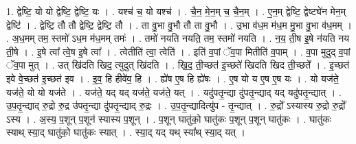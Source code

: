 \documentclass[17pt]{extarticle}
\begin{document}
1. द्वेष्टि॒ यो यो द्वेष्टि॒ द्वेष्टि॒ यः । . यश्च॑ च॒ यो यश्च॑ । . चै॒न॒ मे॒न॒म् च॒ चै॒न॒म् । . ए॒न॒म् द्वेष्टि॒ द्वेष्ट्ये॑न मेन॒म् द्वेष्टि॑ । . द्वेष्टि॒ तौ तौ द्वेष्टि॒ द्वेष्टि॒ तौ । . ता वु॒भा वु॒भौ तौ ता वु॒भौ । . उ॒भा व॑ध॒म म॑ध॒म मु॒भा वु॒भा व॑ध॒मम् । . अ॒ध॒मम् तम॒ स्तमो॑ ऽध॒म म॑ध॒मम् तमः॑ । . तमो॑ नयति नयति॒ तम॒ स्तमो॑ नयति । . न॒य॒ ती॒ष इ॒षे न॑यति नय ती॒षे । . इ॒षे त्वा᳚ त्वे॒ष इ॒षे त्वा᳚ । . त्वेतीति॑ त्वा॒ त्वेति॑ । . इति॑ व॒पां ॅव॒पा मितीति॑ व॒पाम् । . व॒पा मुदुद् व॒पां ॅव॒पा मुत् । . उत् खि॑दति खिद॒ त्युदुत् खि॑दति । . खि॒द॒ ती॒च्छत॑ इ॒च्छते॑ खिदति खिद ती॒च्छते᳚ । . इ॒च्छत॑ इवे वे॒च्छत॑ इ॒च्छत॑ इव । . इ॒व॒ हि हीवे॑व॒ हि । . ह्ये॑ष ए॒ष हि ह्ये॑षः । . ए॒ष यो य ए॒ष ए॒ष यः । . यो यज॑ते॒ यज॑ते॒ यो यो यज॑ते । . यज॑ते॒ यद् यद् यज॑ते॒ यज॑ते॒ यत् । . यदु॑पतृ॒न्द्या दु॑पतृ॒न्द्याद् यद् यदु॑पतृ॒न्द्यात् । . उ॒प॒तृ॒न्द्याद् रु॒द्रो रु॒द्र उ॑पतृ॒न्द्या दु॑पतृ॒न्द्याद् रु॒द्रः । . उ॒प॒तृ॒न्द्यादित्यु॑प - तृ॒न्द्यात् । . रु॒द्रो᳚ ऽस्यास्य रु॒द्रो रु॒द्रो᳚ ऽस्य । . अ॒स्य॒ प॒शून् प॒शून॑ स्यास्य प॒शून् । . प॒शून् घातु॑को॒ घातु॑कः प॒शून् प॒शून् घातु॑कः । . घातु॑कः स्याथ् स्या॒द् घातु॑को॒ घातु॑कः स्यात् । . स्या॒द् यद् यथ् स्या᳚थ् स्या॒द् यत् । \newline
\end{document}
